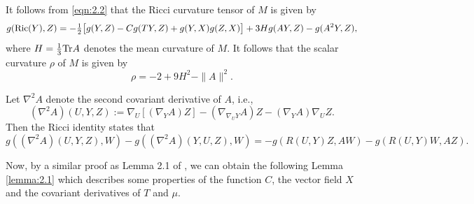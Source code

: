 \documentclass[reqno]{amsart}%
\theoremstyle{definition}
\numberwithin{equation}{section}
\begin{document}
It follows from \eqref{eqn:2.2} that the Ricci curvature tensor of $M$ is given by
%
\begin{equation}\label{eqn:2.4a11}
\begin{aligned}
g({\rm Ric}(Y),Z)%
=-\tfrac{1}{2}\big[g(Y,Z)-Cg(TY,Z)
+g(Y,X)g(Z,X)\big]+3Hg(AY,Z)-g(A^2Y,Z),
\end{aligned}
\end{equation}
%
where %
$H=\frac{1}{3}{\rm Tr}A$ denotes the mean curvature of $M$. %
%
%
%
It follows that the scalar curvature $\rho$ of $M$ is given by
%
\begin{equation}\label{eqn:2.6a11}
\rho=-2+9H^{2}-\|A\|^{2}.
\end{equation}

Let $\nabla^2 A$ denote the second covariant derivative of $A$, i.e.,
$$
(\nabla^{2}A)(U,Y,Z):=\nabla_U[(\nabla_Y A)Z]-(\nabla_{\nabla_U Y}
A)Z-(\nabla_Y A){\nabla_U Z}.
$$
Then the Ricci identity states that
%
\begin{equation}\label{eqn:ric}
g((\nabla^{2}A)(U,Y,Z),W)-g((\nabla^{2}A)(Y,U,Z),W)
=-g( R(U,Y)Z,AW)-g( R(U,Y)W,AZ).
\end{equation}

Now, by a similar proof as Lemma 2.1 of \cite{LVWY},
we can obtain the following Lemma \ref{lemma:2.1} which describes some properties
of the function $C$, the vector field $X$ and the covariant derivatives of $T$ and $\mu$.
\end{document}
